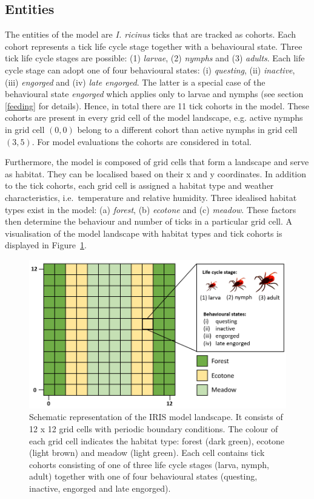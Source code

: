 \documentclass[a4paper, 11pt]{scrartcl}
\begin{document}
\subsection{Entities}
The entities of the model are \emph{I. ricinus} ticks that are tracked as cohorts. Each cohort represents a tick life cycle stage together with a behavioural state. Three tick life cycle stages are possible: (1) \emph{larvae}, (2) \emph{nymphs} and (3) \emph{adults}. Each life cycle stage can adopt one of four behavioural states: (i) \emph{questing}, (ii) \emph{inactive}, (iii)  \emph{engorged} and (iv) \emph{late engorged}. The latter is a special case of the behavioural state \emph{engorged} which applies only to larvae and nymphs (see section \ref{feeding} for details). Hence, in total there are 11 tick cohorts in the model. These cohorts are present in every grid cell of the model landscape, e.g. active nymphs in grid cell $(0,0)$ belong to a different cohort than active nymphs in grid cell $(3,5)$. For model evaluations the cohorts are considered in total. 

Furthermore, the model is composed of grid cells that form a landscape and serve as habitat. They can be localised based on their x and y coordinates. In addition to the tick cohorts, each grid cell is assigned a habitat type and weather characteristics, i.e.\ temperature and relative humidity. Three idealised habitat types exist in the model: (a) \emph{forest}, (b) \emph{ecotone} and (c) \emph{meadow}. These factors then determine the behaviour and number of ticks in a particular grid cell. A visualisation of the model landscape with habitat types and tick cohorts is displayed in Figure~\ref{fig:iris_landscape}.

\begin{figure}[h!]
	\centering
	\includegraphics[width=0.75\linewidth]{figures/iris_landscape.png}
	\caption[Schematic representation of the IRIS model landscape.]{Schematic representation of the IRIS model landscape. It consists of 12 x 12 grid cells with periodic boundary conditions. The colour of each grid cell indicates the habitat type: forest (dark green), ecotone (light brown) and meadow (light green). Each cell contains tick cohorts consisting of one of three life cycle stages (larva, nymph, adult) together with one of four behavioural states (questing, inactive, engorged and late engorged).}
	\label{fig:iris_landscape}
\end{figure}
\end{document}
